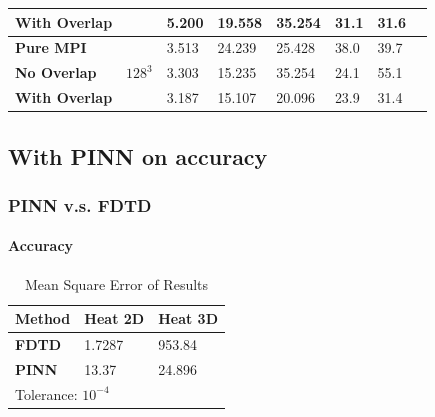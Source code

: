 \begin{frame}
\begin{center}
\begin{tabular}{p{2.5cm} p{1cm} p{1.5cm} p{1.5cm} p{1.5cm} p{1.5cm} p{1cm} p{1cm}}
          \bfseries With Overlap  &                               & 5.200  & 19.558              &  35.254                    & 31.1 & 31.6 \\
          \midrule
          \bfseries Pure MPI      & \multirow{3}{*}{$128^3$}      & 3.513  & 24.239              &  25.428                    & 38.0 & 39.7 \\
          \bfseries No Overlap    &                               & 3.303  & 15.235              &  35.254                    & 24.1 & 55.1 \\
          \bfseries With Overlap  &                               & 3.187  & 15.107              &  20.096                    & 23.9 & 31.4 \\
          \bottomrule
        \end{tabular}
      \end{center}
  

\end{frame}






\subsection{With PINN on accuracy}


\begin{frame}
  \frametitle{PINN v.s. FDTD}
  \framesubtitle{Accuracy}

  \begin{table}
    \caption{Mean Square Error of Results}
    \begin{center}
      \footnotesize
      \begin{tabular}{p{1.5cm} p{1.5cm} p{1.5cm}}
        \toprule
        \bfseries Method  & \bfseries Heat 2D      & \bfseries Heat 3D         \\
        \midrule 
        \bfseries FDTD    & 1.7287  & 953.84 \\
        \bfseries PINN    & 13.37   & 24.896 \\
        \bottomrule 
        \multicolumn{3}{l}{Tolerance: $10^{-4}$} \\
      \end{tabular}
    \end{center}
  \end{table}


  

\end{frame}

